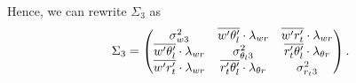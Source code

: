 Hence, we can rewrite $\Sigma_3$ as
\begin{align}
    \Sigma_3 =
    \begin{pmatrix}
        \sigma_{w 3}^2 &
        \overline{w' \theta_l'} \cdot \lambda_{w r} &
        \overline{w' r_t'} \cdot \lambda_{w r} \\
        \overline{w' \theta_l'} \cdot \lambda_{w r} &
        \sigma_{\theta_l 3}^2 &
        \overline{r_t' \theta_l'} \cdot \lambda_{\theta r} \\
        \overline{w' r_t'} \cdot \lambda_{w r} &
        \overline{r_t' \theta_l'} \cdot \lambda_{\theta r} &
        \sigma_{r_t 3}^2
    \end{pmatrix}.
\end{align}